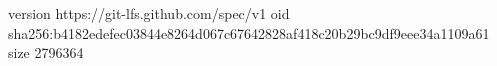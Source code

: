 version https://git-lfs.github.com/spec/v1
oid sha256:b4182edefec03844e8264d067c67642828af418c20b29bc9df9eee34a1109a61
size 2796364
